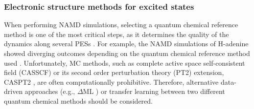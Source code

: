 \documentclass[9pt,bestpractices]{livecoms}
\begin{document}
\subsubsection{Electronic structure methods for excited states}
\label{sec:elstructure}

When performing NAMD simulations, selecting a quantum chemical reference method is one of the most critical steps, as it determines the quality of the dynamics along several PESs \cite{RN105, RN99}. For example, the NAMD simulations of H-adenine showed diverging outcomes depending on the quantum chemical reference method used \cite{RN71}. Unfortunately, MC methods, such as complete active space self-consistent field (CASSCF) \cite{RN138} or its second order perturbation theory (PT2) extension, CASPT2 \cite{RN70}, are often computationally prohibitive. Therefore, alternative data-driven approaches (e.g., $\Delta$ML \cite{RN112}) or transfer learning \cite{RN69} between two different quantum chemical methods should be considered. 
\end{document}
